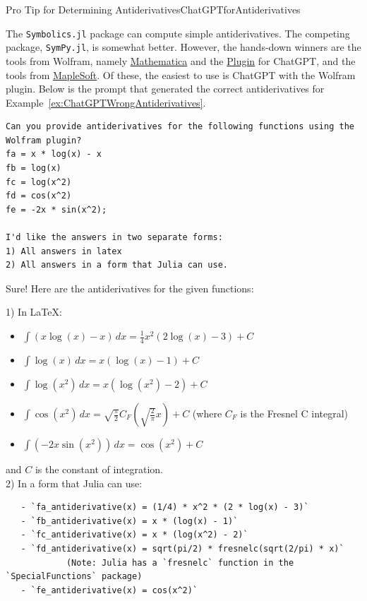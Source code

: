 \begin{funColor}{Pro Tip for Determining Antiderivatives}{ChatGPTforAntiderivatives}

The \texttt{Symbolics.jl} package can compute simple antiderivatives. The competing package, \texttt{SymPy.jl}, is somewhat better. However, the hands-down winners are the tools from Wolfram, namely \href{https://www.wolfram.com/mathematica/}{Mathematica} and the \href{https://www.wolfram.com/wolfram-plugin-chatgpt/}{Plugin} for ChatGPT, and the tools from \href{https://www.maplesoft.com/products/Maple/}{MapleSoft}. Of these, the easiest to use is ChatGPT with the Wolfram plugin. Below is the prompt that generated the correct antiderivatives for Example~\ref{ex:ChatGPTWrongAntiderivatives}.

\begin{verbatim}
Can you provide antiderivatives for the following functions using the Wolfram plugin?
fa = x * log(x) - x
fb = log(x)
fc = log(x^2)
fd = cos(x^2)
fe = -2x * sin(x^2);

I'd like the answers in two separate forms:
1) All answers in latex
2) All answers in a form that Julia can use. 
\end{verbatim}

Sure! Here are the antiderivatives for the given functions:

1) In LaTeX:
\begin{itemize}
    \item  \( \int (x \log(x) - x) \, dx = \frac{1}{4} x^2 (2 \log(x) - 3) + C \)
   \item \( \int \log(x) \, dx = x (\log(x) - 1) + C \)
   \item \( \int \log(x^2) \, dx = x (\log(x^2) - 2) + C \)
   \item \( \int \cos(x^2) \, dx = \sqrt{\frac{\pi}{2}} C_F\left(\sqrt{\frac{2}{\pi}} x\right) + C \) (where \( C_F \) is the Fresnel C integral)
   \item \( \int (-2x \sin(x^2)) \, dx = \cos(x^2) + C \)
\end{itemize}
and \( C \) is the constant of integration.\\

2) In a form that Julia can use:
\begin{verbatim}
   - `fa_antiderivative(x) = (1/4) * x^2 * (2 * log(x) - 3)`
   - `fb_antiderivative(x) = x * (log(x) - 1)`
   - `fc_antiderivative(x) = x * (log(x^2) - 2)`
   - `fd_antiderivative(x) = sqrt(pi/2) * fresnelc(sqrt(2/pi) * x)` 
            (Note: Julia has a `fresnelc` function in the `SpecialFunctions` package)
   - `fe_antiderivative(x) = cos(x^2)`
\end{verbatim}
  
\end{funColor}

